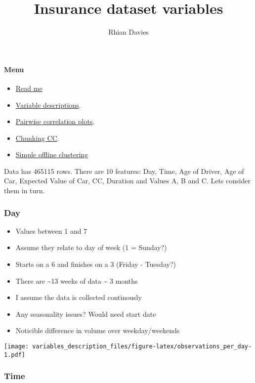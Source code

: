 \documentclass[]{article}
\title{Insurance dataset variables}
\author{Rhian Davies}
\date{}
\providecommand{\tightlist}{%
  \setlength{\itemsep}{0pt}\setlength{\parskip}{0pt}}
\let\oldparagraph\paragraph
\renewcommand{\paragraph}[1]{\oldparagraph{#1}\mbox{}}
\begin{document}
\maketitle

\paragraph{Menu}\label{menu}

\begin{itemize}
\tightlist
\item
  \href{../ReadMe.html}{Read me}
\item
  \href{variables_description.html}{Variable descriptions}.
\item
  \href{Pairwise_correlations_for_value_B.html}{Pairwise correlation
  plots}.
\item
  \href{Chunking_CC.html}{Chunking CC}.
\item
  \href{Simple_offline_algorithms.html}{Simple offline clustering}
\end{itemize}

Data has 465115 rows. There are 10 features: Day, Time, Age of Driver,
Age of Car, Expected Value of Car, CC, Duration and Values A, B and C.
Lets consider them in turn.

\subsubsection{Day}\label{day}

\begin{itemize}
\tightlist
\item
  Values between 1 and 7
\item
  Assume they relate to day of week (1 = Sunday?)
\item
  Starts on a 6 and finishes on a 3 (Friday - Tuesday?)
\item
  There are \textasciitilde{}13 weeks of data \textasciitilde{} 3 months
\item
  I assume the data is collected continously
\item
  Any seasonality issues? Would need start date
\item
  Noticible difference in volume over weekday/weekends
\end{itemize}

\texttt{[image: variables\_description\_files/figure-latex/observations\_per\_day-1.pdf]}

\subsubsection{Time}\label{time}
\end{document}
